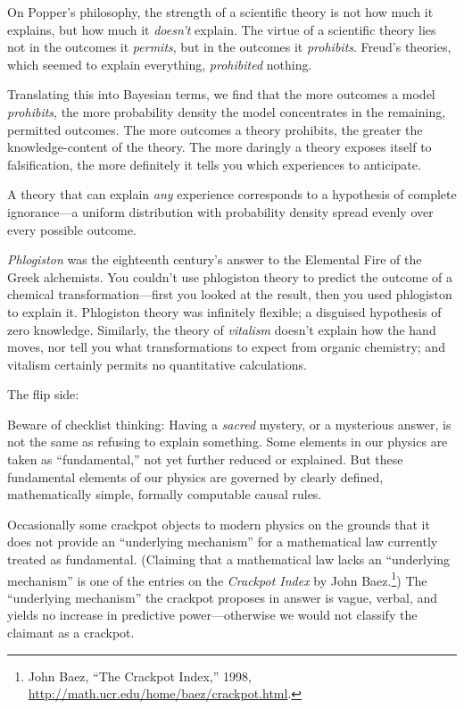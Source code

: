 {
 On Popper's philosophy, the strength of a
scientific theory is not how much it explains, but how much it
\textit{doesn't} explain. The virtue of a scientific
theory lies not in the outcomes it \textit{permits}, but in the
outcomes it \textit{prohibits}. Freud's theories, which
seemed to explain everything, \textit{prohibited} nothing.}

{
 Translating this into Bayesian terms, we find that the more
outcomes a model \textit{prohibits}, the more probability density the
model concentrates in the remaining, permitted outcomes. The more
outcomes a theory prohibits, the greater the knowledge-content of the
theory. The more daringly a theory exposes itself to falsification, the
more definitely it tells you which experiences to anticipate.}

{
 A theory that can explain \textit{any} experience corresponds to a
hypothesis of complete ignorance---a uniform distribution with
probability density spread evenly over every possible outcome.}

\hr

{
 \textit{Phlogiston} was the eighteenth century's
answer to the Elemental Fire of the Greek alchemists. You
couldn't use phlogiston theory to predict the outcome
of a chemical transformation---first you looked at the result, then you
used phlogiston to explain it. Phlogiston theory was infinitely
flexible; a disguised hypothesis of zero knowledge. Similarly, the
theory of \textit{vitalism} doesn't explain how the
hand moves, nor tell you what transformations to expect from organic
chemistry; and vitalism certainly permits no quantitative
calculations.}

{
 The flip side:}

{
 Beware of checklist thinking: Having a \textit{sacred} mystery, or
a mysterious answer, is not the same as refusing to explain something.
Some elements in our physics are taken as
``fundamental,'' not yet further
reduced or explained. But these fundamental elements of our physics are
governed by clearly defined, mathematically simple, formally computable
causal rules.}

{
 Occasionally some crackpot objects to modern physics on the
grounds that it does not provide an ``underlying
mechanism'' for a mathematical law currently treated
as fundamental. (Claiming that a mathematical law lacks an
``underlying mechanism'' is one of
the entries on the \textit{Crackpot Index} by John
Baez.\footnote{John Baez, ``The Crackpot
Index,'' 1998,
\url{http://math.ucr.edu/home/baez/crackpot.html}.}) The ``underlying
mechanism'' the crackpot proposes in answer is vague,
verbal, and yields no increase in predictive power---otherwise we would
not classify the claimant as a crackpot.}

